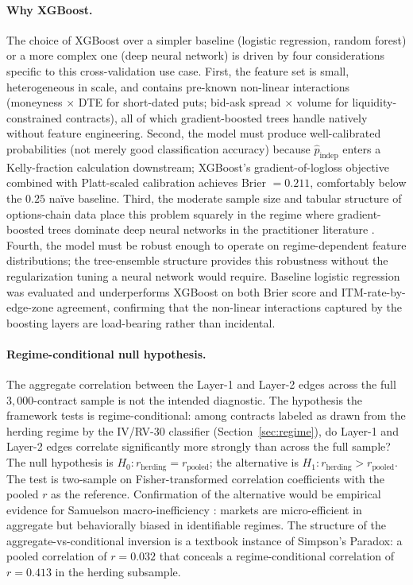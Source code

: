 \documentclass[12pt, letterpaper]{article}
\begin{document}
\paragraph{Why XGBoost.} The choice of XGBoost over a simpler
baseline (logistic regression, random forest) or a more complex one
(deep neural network) is driven by four considerations specific to
this cross-validation use case. First, the feature set is small,
heterogeneous in scale, and contains pre-known non-linear
interactions (moneyness $\times$ DTE for short-dated puts; bid-ask
spread $\times$ volume for liquidity-constrained contracts), all of
which gradient-boosted trees handle natively without feature
engineering. Second, the model must produce well-calibrated
probabilities (not merely good classification accuracy) because
$\hat{p}_{\text{indep}}$ enters a Kelly-fraction calculation
downstream; XGBoost's gradient-of-logloss objective combined with
Platt-scaled calibration achieves Brier $= 0.211$, comfortably below
the $0.25$ naïve baseline. Third, the moderate sample size and
tabular structure of options-chain data place this problem squarely in
the regime where gradient-boosted trees dominate deep neural networks
in the practitioner literature \citep{Grinsztajn2022}. Fourth, the
model must be robust enough to operate on regime-dependent feature
distributions; the tree-ensemble structure provides this robustness
without the regularization tuning a neural network would require.
Baseline logistic regression was evaluated and underperforms XGBoost
on both Brier score and ITM-rate-by-edge-zone agreement, confirming
that the non-linear interactions captured by the boosting layers are
load-bearing rather than incidental.

\paragraph{Regime-conditional null hypothesis.} The aggregate
correlation between the Layer-1 and Layer-2 edges across the full
$3{,}000$-contract sample is not the intended diagnostic. The
hypothesis the framework tests is regime-conditional: among contracts
labeled as drawn from the herding regime by the IV/RV-30 classifier
(Section~\ref{sec:regime}), do Layer-1 and Layer-2 edges correlate
significantly more strongly than across the full sample? The null
hypothesis is $H_{0}: r_{\text{herding}} = r_{\text{pooled}}$; the
alternative is $H_{1}: r_{\text{herding}} > r_{\text{pooled}}$. The
test is two-sample on Fisher-transformed correlation coefficients
with the pooled $r$ as the reference. Confirmation of the alternative
would be empirical evidence for Samuelson macro-inefficiency
\citep{Fama1970}: markets are micro-efficient in aggregate but
behaviorally biased in identifiable regimes. The structure of the
aggregate-vs-conditional inversion is a textbook instance of
Simpson's Paradox: a pooled correlation of $r = 0.032$ that conceals
a regime-conditional correlation of $r = 0.413$ in the herding
subsample.
\end{document}
